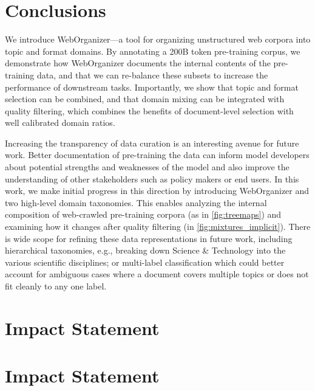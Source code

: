 \section{Conclusions}

We introduce WebOrganizer---a tool for organizing unstructured web corpora into topic and format domains. By annotating a 200B token pre-training corpus, 
we demonstrate how WebOrganizer documents the internal contents of the pre-training data, and that we can re-balance these subsets to increase the performance of downstream tasks.
Importantly, we show that topic and format selection can be combined, and that domain mixing can be integrated with quality filtering, which combines the benefits of document-level selection with well calibrated domain ratios.

Increasing the transparency of data curation is an interesting avenue for future work. 
Better documentation of pre-training the data can inform model developers about potential strengths and weaknesses of the model and also improve the understanding of other stakeholders such as policy makers or end users.
In this work, we make initial progress in this direction by introducing WebOrganizer and two high-level domain taxonomies. 
This enables analyzing the internal composition of web-crawled pre-training corpora (as in \autoref{fig:treemaps}) and examining how it changes after  quality filtering (in \autoref{fig:mixtures_implicit}). 
There is wide scope for refining these data representations in future work, including hierarchical taxonomies, e.g., breaking down {\atopic Science \& Technology} into the various scientific disciplines; or multi-label classification which could better account for ambiguous cases where a document covers multiple topics or does not fit cleanly to any one label.

\ificml
\section*{Impact Statement}
\else
\section*{Impact Statement}
\fi

